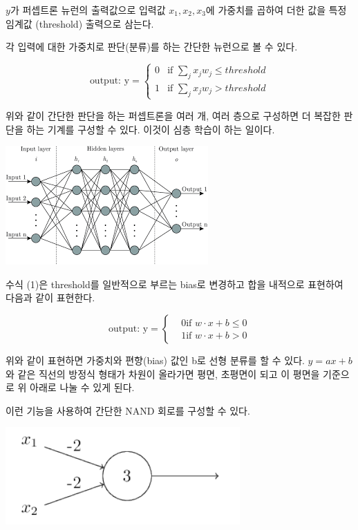 \documentclass[ %
    a4paper,    %
    amsmath,    %
    itemph,     %
]{oblivoir}     %
\begin{document}
$y$가 퍼셉트론 뉴런의 출력값으로 입력값 $x_1, x_2, x_3$에 가중치를 곱하여 
더한 값을 특정 임계값 (threshold) 출력으로 삼는다. 


각 입력에 대한 가중치로 판단(분류)를 하는 간단한 뉴런으로 볼 수 있다. 

\begin{equation}
\text{output: y} = \begin{cases} 
				0 & \text{if } \sum_j x_j w_j \le threshold \\
				1 & \text{if } \sum_j x_j w_j > threshold 
				\end{cases}
\end{equation}


위와 같이 간단한 판단을 하는 퍼셉트론을 여러 개, 여러 층으로 구성하면 
더 복잡한 판단을 하는 기계를 구성할 수 있다. 이것이 심층 학습이 하는 
일이다. 

\begin{center}
\includegraphics[scale=1.2]{image/4_deep_nn}
\end{center}

수식 (1)은 threshold를 일반적으로 부르는 bias로 변경하고
합을 내적으로 표현하여 다음과 같이 표현한다. 

\begin{equation}
\text{output: y} = \begin{cases} 
				& 0 \text{if } w \cdot x + b \le 0 \\
				& 1 \text{if } w \cdot x + b > 0  
				\end{cases}
\end{equation}

위와 같이 표현하면 가중치와 편향(bias) 값인 b로 선형 분류를 할 수 있다. 
$y = ax + b$와 같은 직선의 방정식 형태가 차원이 올라가면 평면, 초평면이 
되고 이 평면을 기준으로 위 아래로 나눌 수 있게 된다. 

이런 기능을 사용하여 간단한 NAND 회로를 구성할 수 있다. 

\begin{center}
\includegraphics[scale=0.5]{image/5_nand}
\end{center}
\end{document}
